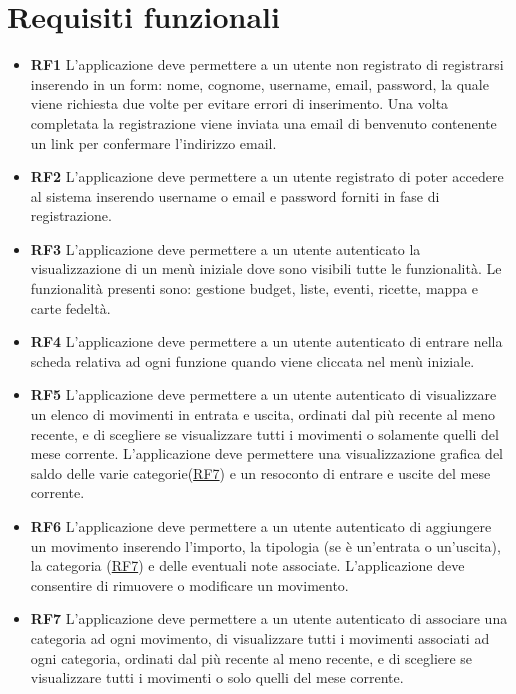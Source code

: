 \documentclass[a4paper,12pt]{article}
\begin{document}
\section*{Requisiti funzionali}
\begin{itemize} \setlength\itemsep{0.01em}
\item \textbf {\hypertarget{RF1}{RF1}} L'applicazione deve permettere a un utente non registrato di registrarsi inserendo in un form: nome, cognome, username, email, password, la quale viene richiesta due volte per evitare errori di inserimento. Una volta completata la registrazione viene inviata una email di benvenuto contenente un link per confermare l'indirizzo email.
\item \textbf {\hypertarget{RF2}{RF2}} L'applicazione deve permettere a un utente registrato di poter accedere al sistema inserendo username o email e password forniti in fase di registrazione.
\item \textbf {\hypertarget{RF3}{RF3}} L'applicazione deve permettere a un utente autenticato la visualizzazione di un menù iniziale dove sono visibili tutte le funzionalità. Le funzionalità presenti sono: gestione budget, liste, eventi, ricette, mappa e carte fedeltà.
\item \textbf {\hypertarget{RF4}{RF4}} L'applicazione deve permettere a un utente autenticato di entrare nella scheda relativa ad ogni funzione quando viene cliccata nel menù iniziale.
\item \textbf {\hypertarget{RF5}{RF5}} L'applicazione deve permettere a un utente autenticato di visualizzare un elenco di movimenti in entrata e uscita, ordinati dal più recente al meno recente, e di scegliere se visualizzare tutti i movimenti o solamente quelli del mese corrente. L'applicazione deve permettere una visualizzazione grafica del saldo delle varie categorie(\hyperlink{RF7}{RF7}) e un resoconto di entrare e uscite del mese corrente.
\item \textbf {\hypertarget{RF6}{RF6}} L'applicazione deve permettere a un utente autenticato di aggiungere un movimento inserendo l'importo, la tipologia (se è un'entrata o un'uscita), la categoria (\hyperlink{RF7}{RF7}) e delle eventuali note associate. L'applicazione deve consentire di rimuovere o modificare un movimento.
\item \textbf {\hypertarget{RF7}{RF7}} L'applicazione deve permettere a un utente autenticato di associare una categoria ad ogni movimento, di visualizzare tutti i movimenti associati ad ogni categoria, ordinati dal più recente al meno recente, e di scegliere se visualizzare tutti i movimenti o solo quelli del mese corrente.

\end{itemize}
\end{document}
